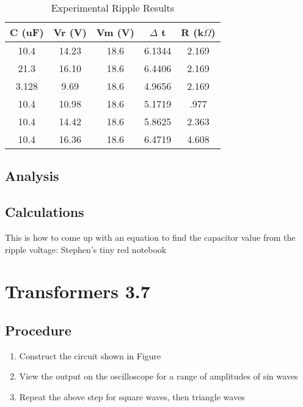 \documentclass[12pt,letterpaper]{report}
\begin{document}
\begin{table}[ht]
\caption{Experimental Ripple Results} %
\centering 
    \begin{tabular}{| c | c | c | c | c |}
    \hline  
    C (uF) & Vr (V) & Vm (V) & $\Delta$ t & R (k$\Omega$) \\
    \hline
    10.4 & 14.23 & 18.6 & 6.1344 & 2.169 \\
    21.3 &16.10 & 18.6& 6.4406 & 2.169 \\
    3.128 & 9.69 & 18.6& 4.9656 &  2.169 \\
    10.4 & 10.98 &18.6& 5.1719 &.977 \\
    10.4 &14.42 & 18.6& 5.8625 & 2.363 \\
    10.4 &16.36 &18.6& 6.4719 & 4.608 \\
    \hline
    \end{tabular}
    \label{table:vpp}
\end{table}


\subsection*{Analysis}

\subsection*{Calculations}
This is how to come up with an equation to find the capacitor value from the ripple voltage: Stephen's tiny red notebook

\section*{Transformers 3.7}
\subsection*{Procedure}

\begin{enumerate}
\item Construct the circuit shown in Figure %
\item View the output on the oscilloscope for a range of amplitudes of sin waves
\item Repeat the above step for square waves, then triangle waves
\end{enumerate}
\end{document}
